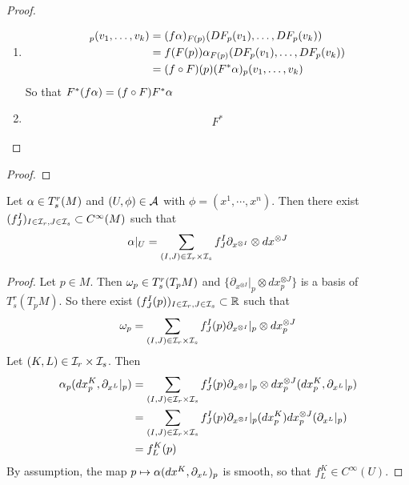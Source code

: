 \documentclass{book}
\begin{document}
	\begin{proof}\
	\begin{enumerate}
	\item 
	\begin{align*}
	[F^*(f \al)]_p(v_1, \dots, v_k) 
	&= (f \al )_{F(p)}(DF_p(v_1), \dots, DF_p(v_k)) \\
	&= f (F(p)) \al_{F(p)} (DF_p(v_1), \dots, DF_p(v_k)) \\
	&= (f \circ F)(p) (F^*\al)_p(v_1, \dots, v_k)
	\end{align*}
	So that $F^*(f \alpha) = (f \circ F) F^* \alpha$
	\item 
	\begin{align*}
		F^*
	\end{align*}
	\end{enumerate}
	
	\end{proof}
	
	
	
	
	
	\begin{defn}
	
	\end{defn}

	
	\begin{ex}
	
	\end{ex}
	
	\begin{proof}
	
	\end{proof}
	
	\begin{ex}
		Let $\alpha \in T^r_s(M)$ and $(U, \phi) \in \mathcal{A}$ with $\phi = (x^1, \cdots, x^n)$. Then there exist $(f^I_J)_{I \in \mathcal{I}_r, J \in \mathcal{I}_s} \subset C^{\infty}(M)$ such that $$\alpha|_U = \sum_{(I,J) \in \mathcal{I}_r \times \mathcal{I}_s} f^I_J \partial_{x^{\otimes I}} \otimes dx^{\otimes J}$$ 
	\end{ex}

	\begin{proof}
		Let $p \in M$. Then $\omega_p \in T^r_s(T_pM)$ and $\bigg \{\partial_{x^{\otimes I}}|_p \otimes dx^{\otimes J}_p \bigg \}$ is a basis of $T^r_s(T_pM)$. So there exist $(f^I_J(p))_{I \in \mathcal{I}_r, J \in \mathcal{I}_s } \subset \mathbb{R}$ such that $$\omega_p = \sum\limits_{(I,J) \in \mathcal{I}_r \times \mathcal{I}_s } f^I_J(p) \partial_{x^{\otimes I}}|_p \otimes dx^{\otimes J}_p $$
		Let $(K,L) \in \mathcal{I}_r \times \mathcal{I}_s$. Then 
		\begin{align*}
		\alpha_p(dx^K_p, \partial_{x^L}|_p) 
		&=  \sum\limits_{(I,J) \in \mathcal{I}_r \times \mathcal{I}_s } f^I_J(p) \partial_{x^{\otimes I}}|_p \otimes dx^{\otimes J}_p(dx^K_p, \partial_{x^L}|_p) \\
		&= \sum\limits_{(I,J) \in \mathcal{I}_r \times \mathcal{I}_s } f^I_J(p) \partial_{x^{\otimes I}}|_p (dx^K_p) dx^{\otimes J}_p(\partial_{x^L}|_p)  \\
		&= f^K_L(p)
		\end{align*}
		By assumption, the map $p \mapsto \alpha(dx^K, \partial_{x^L})_p$ is smooth, so that $f^K_L \in C^{\infty}(U)$.
	
	\end{proof}
	
\end{document}
